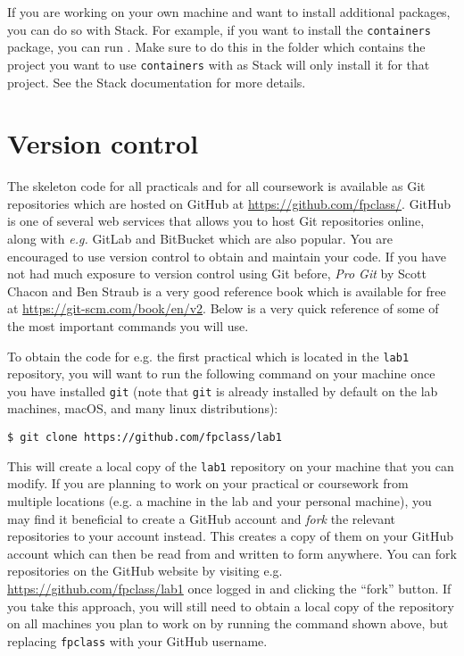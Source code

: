 If you are working on your own machine and want to install additional packages, you can do so with Stack. For example, if you want to install the \texttt{\small containers} package, you can run . Make sure to do this in the folder which contains the project you want to use \texttt{\small containers} with as Stack will only install it for that project. See the Stack documentation for more details.

\section{Version control}
\label{sec:git}

The skeleton code for all practicals and for all coursework is available as Git repositories which are hosted on GitHub at \url{https://github.com/fpclass/}. GitHub is one of several web services that allows you to host Git repositories online, along with \emph{e.g.} GitLab and BitBucket which are also popular. You are encouraged to use version control to obtain and maintain your code. If you have not had much exposure to version control using Git before, \emph{Pro Git} by Scott Chacon and Ben Straub is a very good reference book which is available for free at {\small \url{https://git-scm.com/book/en/v2}}. Below is a very quick reference of some of the most important commands you will use.

To obtain the code for e.g. the first practical which is located in the \texttt{\small lab1} repository, you will want to run the following command on your machine once you have installed \texttt{\small git} (note that \texttt{\small git} is already installed by default on the lab machines, macOS, and many linux distributions):
\begin{verbatim}
$ git clone https://github.com/fpclass/lab1
\end{verbatim}
This will create a local copy of the \texttt{\small lab1} repository on your machine that you can modify. If you are planning to work on your practical or coursework from multiple locations (e.g. a machine in the lab and your personal machine), you may find it beneficial to create a GitHub account and \emph{fork} the relevant repositories to your account instead. This creates a copy of them on your GitHub account which can then be read from and written to form anywhere. You can fork repositories on the GitHub website by visiting e.g. {\small \url{https://github.com/fpclass/lab1}} once logged in and clicking the ``fork'' button. If you take this approach, you will still need to obtain a local copy of the repository on all machines you plan to work on by running the command shown above, but replacing \texttt{\small fpclass} with your GitHub username. 

